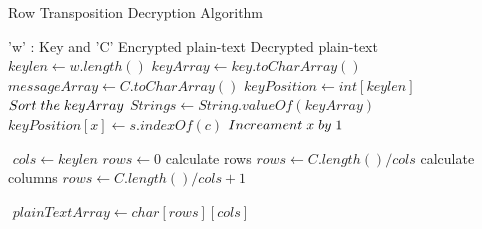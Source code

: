 \documentclass[twoside,twocolumn]{article}
\begin{document}
 {\footnotesize Row Transposition Decryption Algorithm}
\renewcommand {\algorithmicrequire}{\textbf{input:}}
\renewcommand{\algorithmicensure}{\textbf{output:}}
\begin{algorithm}
  \caption{}\label{}
  \begin{algorithmic}[1]
  	\footnotesize
    \Require 'w' : Key and 'C' Encrypted plain-text
    \Ensure Decrypted plain-text
      \State $keylen \gets w.length()$
      \State $keyArray \gets key.toCharArray() $
      \State $messageArray \gets C.toCharArray() $
      \State $keyPosition \gets int [keylen]$
      \State \footnotesize$ $
	  \State $Sort\hspace{0.1cm} the \hspace{0.1cm}keyArray$
	  \State $String s \gets String.valueOf(keyArray)$	  
	  \State \footnotesize$ $
        \State $keyPosition[x] \gets s.indexOf(c)$
        \State $Increament \hspace{0.1cm} x \hspace{0.1cm} by \hspace{0.1cm}1$	
      \EndFor
     
      \State \footnotesize$ $
      \State $cols \gets keylen$
      \State $rows \gets 0$
	   \Comment \tiny{calculate rows}
        \State\footnotesize $rows \gets C.length() / cols$
      \Else \Comment \tiny{calculate columns}
        \State \footnotesize$rows \gets C.length() / cols + 1$
     \EndIf
     
      \State \footnotesize$ $
      \State $plainTextArray \gets char[rows][cols]$
       

\end{algorithmic}
\end{algorithm}
\end{document}

